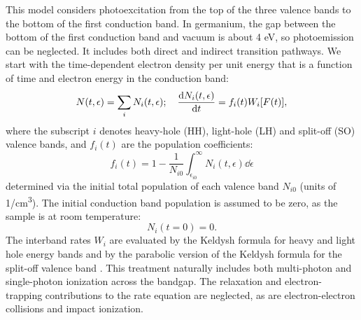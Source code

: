 This model considers photoexcitation from the top of the three valence bands to the bottom of the first conduction band. In germanium, the gap between the bottom of the first conduction band and vacuum is about 4 eV, so photoemission can be neglected. It includes both direct and indirect transition pathways. We start with the time-dependent electron density per unit energy that is a function of time and electron energy in the conduction band:
\begin{equation}
N(t, \epsilon) = \sum_{i} N_i(t, \epsilon); \quad \dv{N_i(t, \epsilon)}{t} = f_i(t) W_i [F(t)],
\end{equation}
where the subscript $i$ denotes heavy-hole (HH), light-hole (LH) and split-off (SO) valence bands, and $f_i(t)$ are the population coefficients:
\begin{equation}
f_i(t) = 1 - \frac{1}{N_{i0}} \int_{\epsilon_{i0}}^{\infty} N_i(t,\epsilon) \dd{\epsilon}
\end{equation}
determined via the initial total population of each valence band $N_{i0}$ (units of 1/cm\textsuperscript{3}). The initial conduction band population is assumed to be zero, as the sample is at room temperature:
\begin{equation}
N_i(t=0)=0.
\end{equation}
The interband rates $W_i$ are evaluated by the Keldysh formula for heavy and light hole energy bands \cite{keldyshIonizationFieldStrong1965} and by the parabolic version of the Keldysh formula for the split-off valence band \cite{gruzdevIonizationNanoparticlesSupershort2014}. This treatment naturally includes both multi-photon and single-photon ionization across the bandgap. The relaxation and electron-trapping contributions to the rate equation are neglected, as are electron-electron collisions and impact ionization.

